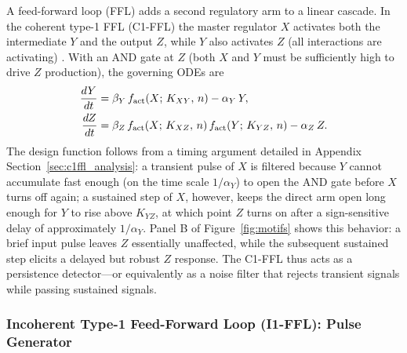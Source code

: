 A feed-forward loop (FFL) adds a second regulatory arm to a linear cascade.
In the coherent type-1 FFL (C1-FFL) the master regulator $X$ activates both
the intermediate $Y$ and the output $Z$, while $Y$ also activates $Z$ (all
interactions are activating) \cite{ManganAlon2003}.  With an AND gate at $Z$
(both $X$ and $Y$ must be sufficiently high to drive $Z$ production), the
governing ODEs are
\begin{align}
  \frac{dY}{dt} &= \beta_Y\,f_{\rm act}(X;\,K_{XY},\,n)
                   - \alpha_Y\,Y, \label{eq:c1ffl_Y}\\
  \frac{dZ}{dt} &= \beta_Z\,f_{\rm act}(X;\,K_{XZ},\,n)\,
                              f_{\rm act}(Y;\,K_{YZ},\,n)
                   - \alpha_Z\,Z. \label{eq:c1ffl_Z}
\end{align}
The design function follows from a timing argument detailed in
Appendix Section~\ref{sec:c1ffl_analysis}: a transient pulse of $X$ is
filtered because $Y$ cannot accumulate fast enough (on the time scale
$1/\alpha_Y$) to open the AND gate before $X$ turns off again; a sustained
step of $X$, however, keeps the direct arm open long enough for $Y$ to rise
above $K_{YZ}$, at which point $Z$ turns on after a sign-sensitive delay of
approximately $1/\alpha_Y$.  Panel B of Figure~\ref{fig:motifs} shows
this behavior: a brief input pulse leaves $Z$ essentially unaffected, while
the subsequent sustained step elicits a delayed but robust $Z$ response.
The C1-FFL thus acts as a persistence detector---or equivalently as a noise
filter that rejects transient signals while passing sustained signals.

\subsubsection*{Incoherent Type-1 Feed-Forward Loop (I1-FFL): Pulse Generator}

